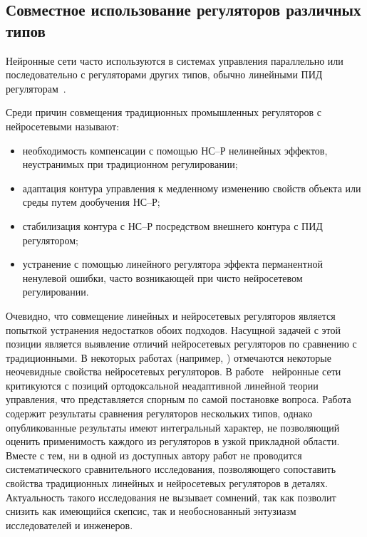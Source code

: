 
\subsection{Совместное использование регуляторов различных типов}

Нейронные сети часто используются в системах управления параллельно
или последовательно с регуляторами других типов, обычно линейными ПИД
регуляторам~\cite{steck96}\cite{sigom00}\cite{chenmills97}.

Среди причин совмещения традиционных промышленных регуляторов с
нейросетевыми называют:

\begin{itemize}

\item
необходимость компенсации с помощью НС--Р нелинейных эффектов,
неустранимых при традиционном регулировании;

\item
адаптация контура управления к медленному изменению свойств объекта
или среды путем дообучения НС--Р;

\item
стабилизация контура с НС--Р посредством внешнего контура с ПИД
регулятором;

\item
устранение с помощью линейного регулятора эффекта перманентной
ненулевой ошибки, часто возникающей при чисто нейросетевом
регулировании.

\end{itemize}

Очевидно, что совмещение линейных и нейросетевых регуляторов является
попыткой устранения недостатков обоих подходов.  Насущной задачей с
этой позиции является выявление отличий нейросетевых регуляторов по
сравнению с традиционными.  В некоторых работах (например,
\cite{chenmills97}) отмечаются некоторые неочевидные свойства
нейросетевых регуляторов.  В работе~\cite{warwick96} нейронные сети
критикуются с позиций ортодоксальной неадаптивной линейной теории
управления, что представляется спорным по самой постановке вопроса.
Работа~\cite{khomyu96} содержит результаты сравнения регуляторов
нескольких типов, однако опубликованные результаты имеют интегральный
характер, не позволяющий оценить применимость каждого из регуляторов в
узкой прикладной области.  Вместе с тем, ни в одной из доступных
автору работ не проводится систематического сравнительного
исследования, позволяющего сопоставить свойства традиционных линейных
и нейросетевых регуляторов в деталях.  Актуальность такого
исследования не вызывает сомнений, так как позволит снизить как
имеющийся скепсис, так и необоснованный энтузиазм исследователей и
инженеров.

